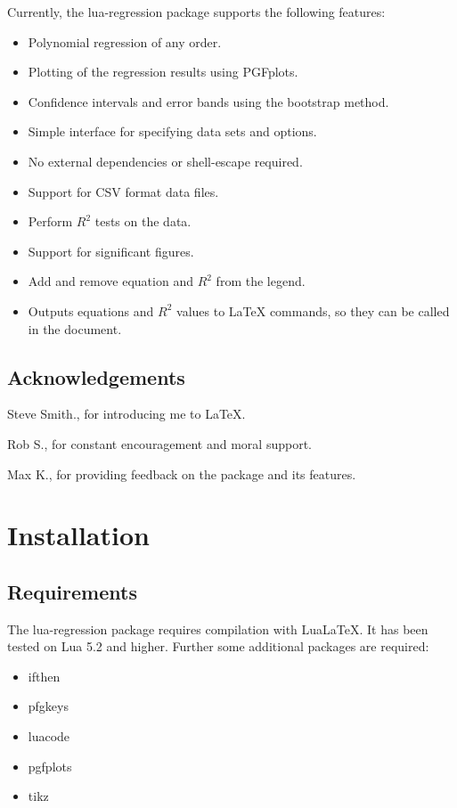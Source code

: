 \documentclass[11pt]{article}
\begin{document}
    Currently, the {\ttfamily lua-regression} package supports the following features:
    \begin{itemize}
        \item Polynomial regression of any order.
        \item Plotting of the regression results using PGFplots.
        \item Confidence intervals and error bands using the bootstrap method.
        \item Simple interface for specifying data sets and options.
        \item No external dependencies or {\ttfamily shell-escape} required.
        \item Support for CSV format data files.
        \item Perform $R^2$ tests on the data.
        \item Support for significant figures.
        \item Add and remove equation and $R^2$ from the legend.
        \item Outputs equations and $R^2$ values to \LaTeX{} commands, so they can be called in the document.
    \end{itemize}

    \subsection{Acknowledgements}
    
    Steve Smith., for introducing me to \LaTeX{}.

    Rob S., for constant encouragement and moral support.

    Max K., for providing feedback on the package and its features.

    \section{Installation}

    \subsection{Requirements} 
    
    The {\ttfamily lua-regression} package requires compilation with Lua\LaTeX{}. It has been tested on Lua 5.2 and higher.
    Further some additional packages are required:

    \begin{multicols}{3}
        {\ttfamily
            \begin{itemize}
            	\item ifthen
                \item pfgkeys
                \item luacode
                \item pgfplots
                \item tikz
            \end{itemize}
        }
    \end{multicols}
\end{document}
